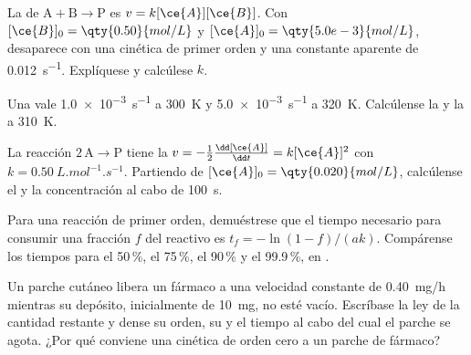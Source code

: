 \begin{exercise}[$\star\star$]\label{exo:b1:rate-laws:7}
La  de $\mathrm{A} + \mathrm{B} \longrightarrow \mathrm{P}$ es $v = k[\ce{A}][\ce{B}]$. Con
$[\ce{B}]_0 = \qty{0.50}{mol/L}$ y $[\ce{A}]_0 = \qty{5.0e-3}{mol/L}$,
 desaparece con una cinética de primer orden y una constante
aparente de \qty{0.012}{s^{-1}}. Explíquese y calcúlese $k$.
\end{exercise}

\begin{exercise}[$\star\star$]\label{exo:b1:rate-laws:8}
Una  vale \qty{1.0e-3}{s^{-1}} a \qty{300}{K} y
\qty{5.0e-3}{s^{-1}} a \qty{320}{K}. Calcúlense la  y
la  a \qty{310}{K}.
\end{exercise}

\begin{exercise}[$\star\star$]\label{exo:b1:rate-laws:9}
La reacción $2\,\mathrm{A} \longrightarrow \mathrm{P}$ tiene la  $v = -\frac12\frac{\dd[\ce{A}]}
{\dd t} = k[\ce{A}]^2$ con $k = \qty{0.50}{L.mol^{-1}.s^{-1}}$. Partiendo
de $[\ce{A}]_0 = \qty{0.020}{mol/L}$, calcúlense el  y la concentración al cabo de \qty{100}{s}.
\end{exercise}

\begin{exercise}[$\star\star\star$]\label{exo:b1:rate-laws:10}
Para una reacción de primer orden, demuéstrese que el tiempo necesario
para consumir una fracción $f$ del reactivo es $t_f = -\ln(1 - f)/(ak)$.
Compárense los tiempos para el 50\,\%, el 75\,\%, el 90\,\% y el
99.9\,\%, en .
\end{exercise}

\begin{exercise}[$\star\star\star$]\label{exo:b1:rate-laws:11}
Un parche cutáneo libera un fármaco a una velocidad constante de
\qty{0.40}{mg/h} mientras su depósito, inicialmente de \qty{10}{mg}, no
esté vacío. Escríbase la ley de la cantidad restante y dense su orden, su
 y el tiempo al cabo del cual el parche se agota.
¿Por qué conviene una cinética de orden cero a un parche de fármaco?
\end{exercise}

